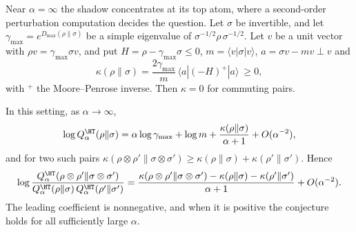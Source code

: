 Near $\alpha=\infty$ the shadow concentrates at its top atom, where a second-order perturbation computation decides the question. Let $\sigma$ be invertible, and let $\gamma_{\max}=e^{D_{\max}(\rho\|\sigma)}$ be a simple eigenvalue of $\sigma^{-1/2}\rho\,\sigma^{-1/2}$. Let $v$ be a unit vector with $\rho v=\gamma_{\max}\sigma v$, and put $H=\rho-\gamma_{\max}\sigma\le0$, $m=\langle v|\sigma|v\rangle$, $a=\sigma v-mv\perp v$ and
\[
\kappa(\rho\|\sigma)=\frac{2\gamma_{\max}}{m}\,\langle a|(-H)^+|a\rangle\ \ge0,
\]
with ${}^+$ the Moore--Penrose inverse. Then $\kappa=0$ for commuting pairs.

\begin{theorem}[First order at $\alpha=\infty$]\label{shB:thm:superinf}
In this setting, as $\alpha\to\infty$,
\[
\log Q^\HT_\alpha(\rho\|\sigma)=\alpha\log\gamma_{\max}+\log m+\frac{\kappa(\rho\|\sigma)}{\alpha+1}+O(\alpha^{-2}),
\]
and for two such pairs $\kappa(\rho\otimes\rho'\|\sigma\otimes\sigma')\ge\kappa(\rho\|\sigma)+\kappa(\rho'\|\sigma')$. Hence
\[
\log\frac{Q^\HT_\alpha(\rho\otimes\rho'\|\sigma\otimes\sigma')}{Q^\HT_\alpha(\rho\|\sigma)\,Q^\HT_\alpha(\rho'\|\sigma')}=\frac{\kappa(\rho\otimes\rho'\|\sigma\otimes\sigma')-\kappa(\rho\|\sigma)-\kappa(\rho'\|\sigma')}{\alpha+1}+O(\alpha^{-2}).
\]
The leading coefficient is nonnegative, and when it is positive the conjecture holds for all sufficiently large $\alpha$.
\end{theorem}

